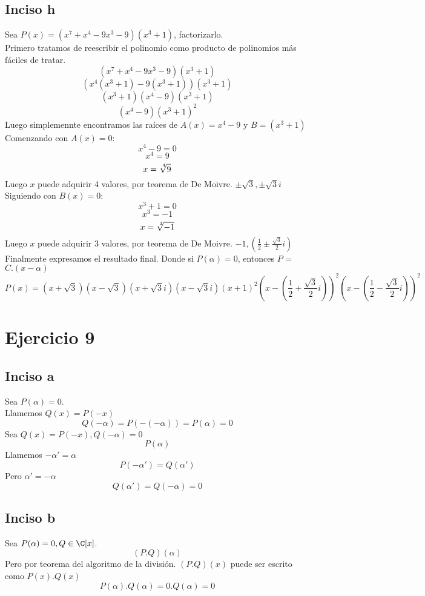 \documentclass[10pt]{article}
\begin{document}
\subsection{Inciso h}
Sea $P(x) = (x^7 + x^4 - 9x^3 - 9)(x^3 + 1)$, factorizarlo.\\
Primero tratamos de reescribir el polinomio como producto de polinomios más fáciles de tratar.
$$(x^7 + x^4 - 9x^3 - 9)(x^3 + 1)$$
$$(x^4(x^3 + 1) - 9(x^3 + 1))(x^3 + 1)$$
$$(x^3 + 1)(x^4 - 9)(x^3 + 1)$$
$$(x^4 - 9)(x^3 + 1)^2$$
Luego simplemennte encontramos las raíces de $A(x) = x^4 - 9$ y $B = (x^3 + 1)$\\
Comenzando con $A(x) = 0$:
$$x^4 - 9 = 0$$
$$x^4 = 9$$
$$x = \sqrt[\leftroot{-2}\uproot{2}4]{9}$$
Luego $x$ puede adquirir 4 valores, por teorema de De Moivre. $\pm\sqrt{3}, \pm\sqrt{3}i$\\
Siguiendo con $B(x) = 0$:
$$x^3 + 1 = 0$$
$$x^3 = -1$$
$$x = \sqrt[\leftroot{-2}\uproot{2}3]{-1}$$
Luego $x$ puede adquirir 3 valores, por teorema de De Moivre. $-1, \left(\frac{1}{2}\pm\frac{\sqrt{3}}{2}i\right)$\\
Finalmente expresamos el resultado final. Donde si $P(\alpha) = 0$, entonces $P$ = $C.(x - \alpha)$
$$P(x) = \left(x+\sqrt{3}\right)\left(x-\sqrt{3}\right)\left(x+\sqrt{3}i\right)\left(x-\sqrt{3}i\right)\left(x+1\right)^2\left(x-\left(\frac{1}{2}+\frac{\sqrt{3}}{2}i\right)\right)^2\left(x-\left(\frac{1}{2}-\frac{\sqrt{3}}{2}i\right)\right)^2$$

\section{Ejercicio 9}
\subsection{Inciso a}
\begin{prf}[$P(\alpha) = 0 \Leftrightarrow Q(x) = P(-x), Q(-\alpha) = 0$]{}
	Sea $P(\alpha) = 0$.\\
	Llamemos $Q(x) = P(-x)$
	$$Q(-\alpha) = P(-(-\alpha)) = P(\alpha) = 0$$
	Sea $Q(x) = P(-x), Q(-\alpha) = 0$
	$$P(\alpha)$$
	Llamemos $-\alpha' = \alpha$
	$$P(-\alpha') = Q(\alpha')$$
	Pero $\alpha' = -\alpha$
	$$Q(\alpha') = Q(-\alpha) = 0$$
\end{prf}

\subsection{Inciso b}
\begin{prf}[$P(\alpha) = 0 \Rightarrow (P.Q)(\alpha) = 0$]{}
	Sea $P(\alpha) = 0, Q \in \C[x]$.\\
	$$(P.Q)(\alpha)$$
	Pero por teorema del algoritmo de la división. $(P.Q)(x)$ puede ser escrito como $P(x).Q(x)$
	$$P(\alpha).Q(\alpha) = 0.Q(\alpha) = 0$$
\end{prf}
\end{document}
